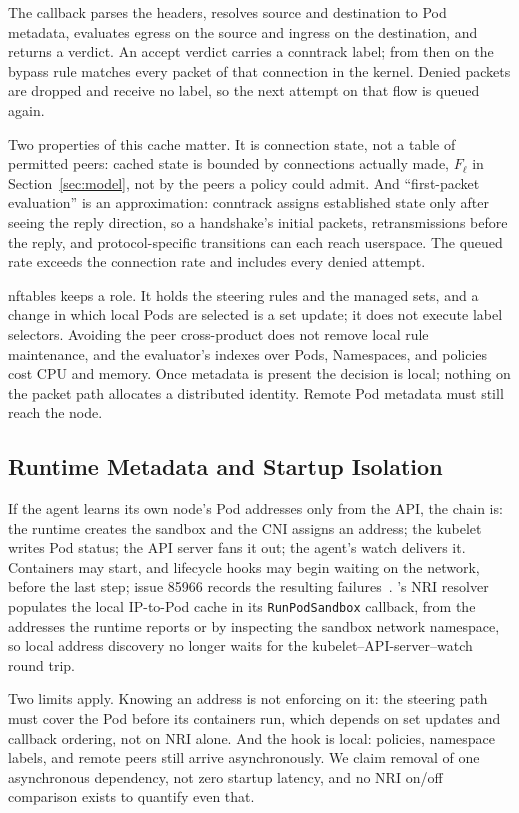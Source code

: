 The callback parses the headers, resolves source and destination to Pod
metadata, evaluates egress on the source and ingress on the destination,
and returns a verdict. An accept verdict carries a conntrack label; from
then on the bypass rule matches every packet of that connection in the
kernel. Denied packets are dropped and receive no label, so the next
attempt on that flow is queued again.

Two properties of this cache matter. It is connection state, not a table
of permitted peers: cached state is bounded by connections actually made,
$F_{\ell}$ in Section~\ref{sec:model}, not by the peers a policy could
admit. And ``first-packet evaluation'' is an approximation: conntrack
assigns established state only after seeing the reply direction, so a
handshake's initial packets, retransmissions before the reply, and
protocol-specific transitions can each reach userspace. The queued rate
exceeds the connection rate and includes every denied attempt.

nftables keeps a role. It holds the steering rules and the managed sets,
and a change in which local Pods are selected is a set update; it does
not execute label selectors. Avoiding the peer cross-product does not
remove local rule maintenance, and the evaluator's indexes over Pods,
Namespaces, and policies cost CPU and memory. Once metadata is present
the decision is local; nothing on the packet path allocates a distributed
identity. Remote Pod metadata must still reach the node.

\subsection{Runtime Metadata and Startup Isolation}
If the agent learns its own node's Pod addresses only from the API, the
chain is: the runtime creates the sandbox and the CNI assigns an address;
the kubelet writes Pod status; the API server fans it out; the agent's
watch delivers it. Containers may start, and lifecycle hooks may begin
waiting on the network, before the last step; issue 85966 records the
resulting failures~\cite{k8s85966}. \sys{}'s NRI resolver populates the
local IP-to-Pod cache in its \texttt{RunPodSandbox} callback, from the
addresses the runtime reports or by inspecting the sandbox network
namespace, so local address discovery no longer waits for the
kubelet--API-server--watch round trip.

Two limits apply. Knowing an address is not enforcing on it: the steering
path must cover the Pod before its containers run, which depends on set
updates and callback ordering, not on NRI alone. And the hook is local:
policies, namespace labels, and remote peers still arrive asynchronously.
We claim removal of one asynchronous dependency, not zero startup
latency, and no NRI on/off comparison exists to quantify even that.

